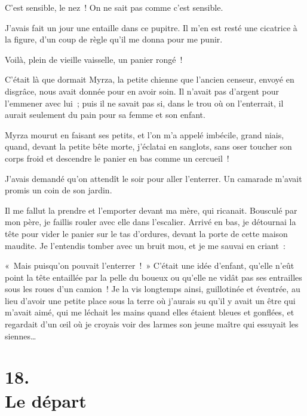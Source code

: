 \documentclass[french,twoside]{book} %
\begin{document}
C’est sensible, le nez ! On ne sait pas comme c’est sensible.\par
J’avais fait un jour une entaille dans ce pupitre. Il m’en est resté une cicatrice à la figure, d’un coup de règle qu’il me donna pour me punir.\par
\bigbreak
\noindent Voilà, plein de vieille vaisselle, un panier rongé !\par
C’était là que dormait Myrza, la petite chienne que l’ancien censeur, envoyé en disgrâce, nous avait donnée pour en avoir soin. Il n’avait pas d’argent pour l’emmener avec lui ; puis il ne savait pas si, dans le trou où on l’enterrait, il aurait seulement du pain pour sa femme et son enfant.\par
Myrza mourut en faisant ses petits, et l’on m’a appelé imbécile, grand niais, quand, devant la petite bête morte, j’éclatai en sanglots, sans oser toucher son corps froid et descendre le panier en bas comme un cercueil !\par
J’avais demandé qu’on attendît le soir pour aller l’enterrer. Un camarade m’avait promis un coin de son jardin.\par
Il me fallut la prendre et l’emporter devant ma mère, qui ricanait. Bousculé par mon père, je faillis rouler avec elle dans l’escalier. Arrivé en bas, je détournai la tête pour vider le panier sur le tas d’ordures, devant la porte de cette maison maudite. Je l’entendis tomber avec un bruit mou, et je me sauvai en criant :\par
« Mais puisqu’on pouvait l’enterrer ! » C’était une idée d’enfant, qu’elle n’eût point la tête entaillée par la pelle du boueux ou qu’elle ne vidât pas ses entrailles sous les roues d’un camion ! Je la vis longtemps ainsi, guillotinée et éventrée, au lieu d’avoir une petite place sous la terre où j’aurais su qu’il y avait un être qui m’avait aimé, qui me léchait les mains quand elles étaient bleues et gonflées, et regardait d’un œil où je croyais voir des larmes son jeune maître qui essuyait les siennes…
\section[{18. Le départ}]{18. \\
Le départ}\renewcommand{\leftmark}{18. \\
Le départ}
\end{document}
